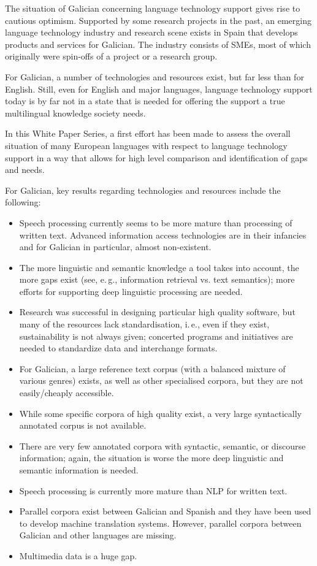 \begin{multicols}{2}
   The situation of Galician concerning language technology support gives rise to cautious optimism. Supported by some research projects in the past, an emerging language technology industry and research scene exists in Spain that develops products and services for Galician. The industry consists of SMEs, most of which originally were spin-offs of a project or a research group.


For Galician, a number of technologies and resources exist, but far less than for English. Still, even for English and major languages, language technology support today is by far not in a state that is needed for offering the support a true multilingual knowledge society needs.

In this White Paper Series, a first effort has been made to assess the overall situation of many European languages with respect to language technology support in a way that allows for high level comparison and identification of gaps and needs.

For Galician, key results regarding technologies and resources include the following:

\begin{itemize}
		\item Speech processing currently seems to be more mature than processing of written text. Advanced information access technologies are in their infancies and for Galician in particular, almost non-existent.
		\item The more linguistic and semantic knowledge a tool takes into account, the more gaps exist (see, e.\,g., information retrieval vs. text semantics); more efforts for supporting deep linguistic processing are needed.
		\item Research was successful in designing particular high quality software, but many of the resources lack standardisation, i.\,e., even if they exist, sustainability is not always given; concerted programs and initiatives are needed to standardize data and interchange formats.
		\item For Galician, a large reference text corpus (with a balanced mixture of various genres) exists, as well as other specialised corpora, but they are not easily/cheaply accessible.
		\item While some specific corpora of high quality exist, a very large syntactically annotated corpus is not available.
		\item There are very few annotated corpora with syntactic, semantic, or discourse information; again, the situation is worse the more deep linguistic and semantic information is needed.
		\item Speech processing is currently more mature than NLP for written text.
		\item Parallel corpora exist between Galician and Spanish and they have been used to develop machine translation systems. However, parallel corpora between Galician and other languages are missing.
		\item Multimedia data is a huge gap.
\end{itemize}


\end{multicols}
